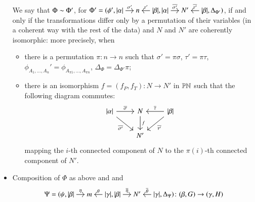 \begin{definition}
\begin{itemize}[leftmargin=*]
    We say that $\Phi \sim \Phi'$, for $\Phi' = (\phi',
    \begin{tikzcd}[cramped,sep=small]
    \length\alpha \ar[r,"\sigma'"] & n & \length\beta \ar[l,"\tau'"']
    \end{tikzcd},
    \begin{tikzcd}[cramped,sep=small]
    \length\alpha \ar[r,"\overline{\sigma'}"] & N' & \length\beta \ar[l,"\overline{\tau'}"']
    \end{tikzcd},
    \Delta_{\Phi'}
    )$,
    if and only if the transformations differ only by a permutation of their variables (in a coherent way with the rest of the data) and $N$ and $N'$ are coherently isomorphic: more precisely, when
    \begin{itemize}[leftmargin=*]
        \item there is a permutation $\pi \colon n \to n$ such that $\sigma'=\pi\sigma$, $\tau'=\pi\tau$, $\phi_{A_1,\dots,A_n}'=\phi_{A_{\pi 1},\dots,A_{\pi n}}$, $\Delta_{\Phi}=\Delta_{\Phi'} \pi$;
        \item there is an isomorphism $f=(f_P,f_T) \colon N \to N'$ in $\mathbb{PN}$ such that the following diagram commutes:
        \[
        \begin{tikzcd}
        \length\alpha \ar[r,"\overline\sigma"] \ar[dr,"\overline{\sigma'}"'] & N \ar[d,"f"] & \length\beta \ar[l,"\overline\tau"'] \ar[dl,"\overline{\tau'}"] \\
        & N' 
        \end{tikzcd}
        \]
        mapping the $i$-th connected component of $N$ to the $\pi(i)$-th connected component of $N'$. %
    \end{itemize}
\item Composition of $\Phi$ as above and
and 
\[
\Psi = 
(\psi,
\begin{tikzcd}[cramped,sep=small]
\length\beta \ar[r,"\eta"] & m & \ar[l,"\theta"'] \length\gamma
\end{tikzcd},
\begin{tikzcd}[cramped,sep=small]
\length\beta \ar[r,"\overline\eta"] & N' & \ar[l,"\overline\theta"'] \length\gamma
\end{tikzcd},
\Delta_\Psi
) \colon (\beta,G) \to (\gamma, H)
\]
\end{itemize}
\end{definition}
